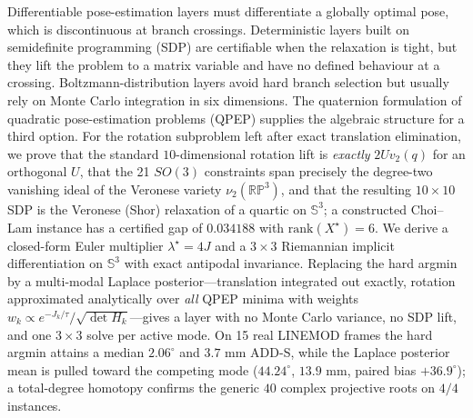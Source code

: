 Differentiable pose-estimation layers must differentiate a globally optimal pose, which is discontinuous at branch crossings. Deterministic layers built on semidefinite programming (SDP) are certifiable when the relaxation is tight, but they lift the problem to a matrix variable and have no defined behaviour at a crossing. Boltzmann-distribution layers avoid hard branch selection but usually rely on Monte Carlo integration in six dimensions. The quaternion formulation of quadratic pose-estimation problems (QPEP) supplies the algebraic structure for a third option. For the rotation subproblem left after exact translation elimination, we prove that the standard $10$-dimensional rotation lift is \emph{exactly} $2Uv_2(q)$ for an orthogonal $U$, that the 21 $SO(3)$ constraints span precisely the degree-two vanishing ideal of the Veronese variety $\nu_2(\mathbb{RP}^3)$, and that the resulting $10\times10$ SDP is the Veronese (Shor) relaxation of a quartic on $\mathbb{S}^3$; a constructed Choi--Lam instance has a certified gap of $0.034188$ with $\mathrm{rank}(X^\star)=6$. We derive a closed-form Euler multiplier $\lambda^\star=4J$ and a $3\times3$ Riemannian implicit differentiation on $\mathbb{S}^3$ with exact antipodal invariance. Replacing the hard argmin by a multi-modal Laplace posterior---translation integrated out exactly, rotation approximated analytically over \emph{all} QPEP minima with weights $w_k\propto e^{-J_k/\tau}/\sqrt{\det H_k}$---gives a layer with no Monte Carlo variance, no SDP lift, and one $3\times3$ solve per active mode. On 15 real LINEMOD frames the hard argmin attains a median $2.06^\circ$ and $3.7$ mm ADD-S, while the Laplace posterior mean is pulled toward the competing mode ($44.24^\circ$, $13.9$ mm, paired bias $+36.9^\circ$); a total-degree homotopy confirms the generic $40$ complex projective roots on $4/4$ instances.
